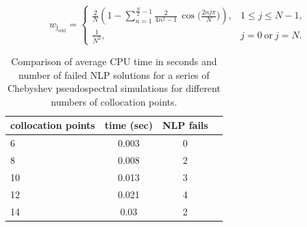 \documentclass[]{article}
\begin{document}
	\[
        w_{\mathrm{j_{odd}}} =
        \begin{cases}
        \displaystyle
        \frac{2}{N}\!\left(
        1 - \sum_{n=1}^{\frac{N}{2}-1} \frac{2}{4n^{2}-1}\,
        \cos\!\Big(\tfrac{2 n j \pi}{N}\Big)
        \right), & 1 \le j \le N-1, \\[2ex]
        \displaystyle \frac{1}{N^{2}}, & j=0\ \text{or}\ j=N.
        \end{cases}
        \]
	
\begin{table}[h!]	
	\begin{center}
		\begin{tabular}{ | l || c | c | c |} 
			\hline
			collocation points & time  (sec) & NLP fails   \\
			\hline
			6 &      0.003 & 0   \\ 
			8  &        0.008 & 2       \\ 
			10  &      0.013 & 3      \\ 
			12 &            0.021  & 4  \\ 
			14 &            0.03  & 2  \\ 
			\hline
		\end{tabular}
		\caption{Comparison of average CPU time in seconds and number of failed NLP solutions for a series of  Chebyshev pseudospectral simulations for different numbers of collocation points. }
		\label{table:cpsCPU}
	\end{center}
\end{table}
\end{document}
